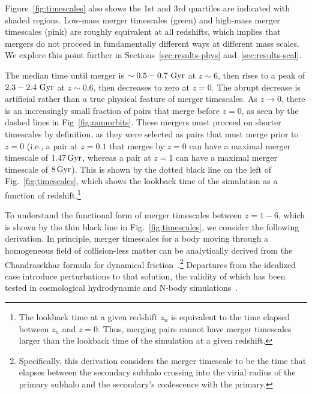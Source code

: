 \documentclass[twocolumn,linenumbers]{aastex631}
\begin{document}
        Figure~\ref{fig:timescales} also shows
        the 1st and 3rd quartiles are indicated with shaded regions. 
        Low-mass merger timescales (green) and high-mass merger timescales (pink) are roughly equivalent at all redshifts, which implies that mergers do not proceed in fundamentally different ways at different mass scales. 
        We explore this point further in Sections~\ref{sec:results-phys} and~\ref{sec:results-scal}.
        
        The median time until merger is $\sim0.5-0.7\,\mathrm{\,Gyr}$ at $z\sim6$, then rises to a peak of $2.3-2.4\,\mathrm{\,Gyr}$ at $z\sim0.6$, then decreases to zero at $z=0$.
        The abrupt decrease is artificial rather than a true physical feature of merger timescales. 
        As $z\to0$, there is an increasingly small fraction of pairs that merge before $z=0$, as seen by the dashed lines in Fig~\ref{fig:numorbits}. 
        These mergers must proceed on shorter timescales by definition, as they were selected as pairs that must merge prior to $z=0$ (i.e., a pair at $z=0.1$ that merges by $z=0$ can have a maximal merger timescale of $1.47\mathrm{\,Gyr}$, whereas a pair at $z=1$ can have a maximal merger timescale of $8\mathrm{\,Gyr}$). 
        This is shown by the dotted black line on the left of Fig.~\ref{fig:timescales}, which shows the lookback time of the simulation as a function of redshift.\footnote{The lookback time at a given redshift $z_n$ is equivalent to the time elapsed between $z_n$ and $z=0$. Thus, merging pairs cannot have merger timescales larger than the lookback time of the simulation at a given redshift.} 

        To understand the functional form of merger timescales between $z=1-6$, which is shown by the thin black line in Fig.~\ref{fig:timescales}, we consider the following derivation. 
        In principle, merger timescales for a body moving through a homogeneous field of collision-less matter can be analytically derived from the Chandrasekhar formula for dynamical friction~\citep{Binney2008}.\footnote{Specifically, this derivation considers the merger timescale to be the time that elapses between the secondary subhalo crossing into the virial radius of the primary subhalo and the secondary's coalescence with the primary.} 
        Departures from the idealized case introduce perturbations to that solution, the validity of which has been tested in cosmological hydrodynamic and N-body simulations~\citep{Jiang2008, BoylanKolchin2008}. 
\end{document}
